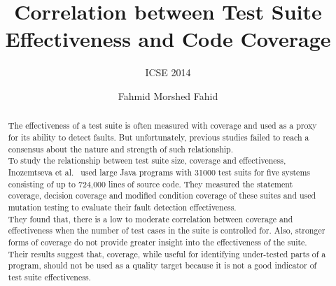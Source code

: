 \documentclass[sigconf]{acmart}
\begin{document}
\title{Correlation between Test Suite Effectiveness and Code Coverage}%
\subtitle{ICSE 2014}


\author{Fahmid Morshed Fahid}

\begin{abstract}
The effectiveness of a test suite is often measured with coverage and used as a proxy for its ability to detect faults. But unfortunately, previous studies failed to reach a consensus about the nature and strength of such relationship. \\ %
To study the relationship between test suite size, coverage and effectiveness, Inozemtseva et al.~\cite{inozemtseva2014coverage} used large Java programs with 31000 test suits for five systems consisting of up to 724,000 lines of source code. They measured the statement coverage, decision coverage and modified condition coverage of these suites and used mutation testing to evaluate their fault detection effectiveness.\\
They found that, there is a low to moderate correlation between coverage and effectiveness when the number of test cases in the suite is controlled for. Also, stronger forms of coverage do not provide greater insight into the effectiveness of the suite. Their results suggest that, coverage, while useful for identifying under-tested parts of a program, should not be used as a quality target because it is not a good indicator of test suite effectiveness.

\end{abstract}


\maketitle




%



\end{document}
